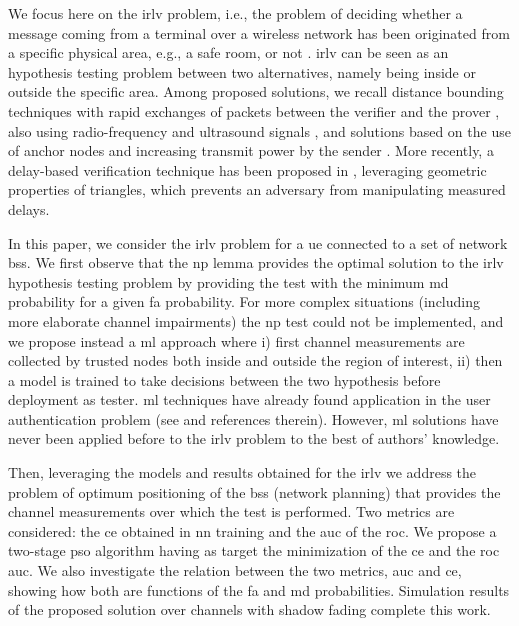 \documentclass[conference]{IEEEtran}
\begin{document}
We focus here on the \ac{irlv} problem, i.e., the problem of deciding whether a message coming from a terminal over a wireless network has been originated from a specific physical area, e.g., a safe room, or not \cite{Zeng-survey}. \ac{irlv} can be seen as an hypothesis testing problem between two alternatives, namely being inside or outside the specific area. Among proposed solutions, we recall distance bounding techniques with rapid exchanges of packets between the verifier and the prover \cite{Brands}, also using radio-frequency and ultrasound signals \cite{Sastry}, and solutions based on the use of anchor nodes and increasing transmit power by the sender \cite{Vora}. More recently, a delay-based verification technique has been proposed  in \cite{7145434}, leveraging geometric properties of triangles, which prevents an adversary from manipulating measured delays.  

In this paper, we consider the \ac{irlv} problem for a \ac{ue} connected to a set of network \acp{bs}. We first observe that the  \ac{np} lemma \cite{Neyman289} provides the optimal solution to the \ac{irlv} hypothesis testing problem by providing  the test with the minimum \ac{md} probability for a given \ac{fa} probability. For more complex situations (including more elaborate channel impairments) the \ac{np} test could not be implemented, and we propose instead a \ac{ml} approach  where i) first channel measurements are collected by trusted nodes both inside and outside the region of interest, ii) then a model is trained to take decisions between the two hypothesis before deployment as tester. \ac{ml} techniques have already found application in the user authentication problem (see  \cite{xiao-2018} and references therein). However, \ac{ml} solutions have never been applied before to the \ac{irlv} problem to the best of authors' knowledge. 

Then, leveraging the  models and results obtained for the \ac{irlv} we address the problem of optimum positioning of the \acp{bs} (network planning) that provides the channel measurements over which the test is performed. Two metrics are considered: the \ac{ce} obtained in \ac{nn} training and the \ac{auc} of the \ac{roc}. We propose a two-stage \ac{pso} algorithm having as target the  minimization of  the \ac{ce} and  the \ac{roc} \ac{auc}. We also investigate the relation between the two metrics, \ac{auc} and \ac{ce}, showing how both are functions of the \ac{fa} and \ac{md} probabilities. Simulation results of the proposed solution over channels with shadow fading complete this work.
\end{document}
